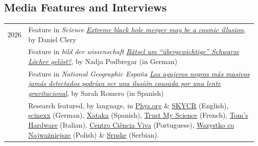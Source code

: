 \documentclass[11pt,a4paper]{article}
\begin{document}

\subsection*{Media Features and Interviews}
\vspace{-.3cm}
\begin{longtable}{c p{15cm}}
2026 & Feature in {\it Science} \href{https://www.science.org/content/article/extreme-black-hole-merger-may-be-cosmic-illusion}{\it Extreme black hole merger may be a cosmic illusion}, by Daniel Clery \\[2pt]
& Feature in {\it bild der wissenschaft} \href{https://wissenschaft.de/artikel/raetsel-um-uebergewichtige-schwarze-loecher-geloest}{\it Rätsel um ``übergewichtige'' Schwarze Löcher gelöst?}, by Nadja Podbregar (in German) \\[2pt]
& Feature in {\it National Geographic España} \href{https://www.nationalgeographic.com.es/ciencia/agujeros-negros-mas-masivos-jamas-vistos-podrian-estar-enganandonos-lente-cosmica-habria-hecho-que-parecieran-gigantes_29335}{\it Los agujeros negros más masivos jamás detectados podrían ser una ilusión causada por una lente gravitacional}, by Sarah Romero (in Spanish) \\[2pt]
& Research featured, by language, in \href{https://phys.org/news/2026-09-biggest-black-hole-merger-massive.html}{Phys.org} \& \href{https://skycr.org/2026/09/03/gw231123-lensing-black-hole-merger/}{SKYCR} (English), \href{https://www.scinexx.de/news/kosmos/ist-das-geheimnis-uebergewichtiger-schwarzer-loecher-gelueftet/}{scinexx} (German), \href{https://www.xataka.com/espacio/fusion-agujeros-negros-que-rompio-todas-reglas-tenia-truco-lente-gravitacional-pudo-haber-inflado-su-tamano}{Xataka} (Spanish), \href{https://trustmyscience.com/les-trous-noirs-interdits-seraient-ils-une-illusion-une-etude-propose-une-explication-surprenante/}{Trust My Science} (French), \href{https://www.tomshw.it/scienze/una-fusione-record-di-buchi-neri-potrebbe-aver-ingannato-ligo}{Tom's Hardware} (Italian), \href{https://www.ccvalg.pt/astronomia/noticias/2026/09/1_gw231123.htm}{Centro Ci\^encia Viva} (Portuguese), \href{https://wszystkoconajwazniejsze.pl/pepites/najwieksze-zderzenie-czarnych-dziur-moglo-nie-byc-rekordowe-sygnal-mogl-zostac-zaklocony/}{Wszystko co Najwa\.zniejsze} (Polish) \& \href{https://srpske.rs/en/news/nauka/2026/09/05/gw231123-record-black-holes-may-be-lensing-illusion}{Srpske} (Serbian). \\[2pt]

\end{longtable}
\end{document}
